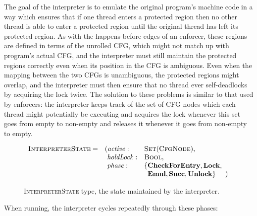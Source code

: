  The goal of the interpreter is to emulate the original
program's machine code in a way which ensures that if one thread
enters a protected region then no other thread is able to enter a
protected region until the original thread has left its protected
region.  As with the happens-before edges of an
enforcer, these regions are defined in terms of the
unrolled CFG, which might not match up with program's actual CFG, and
the interpreter must still maintain the protected regions correctly
even when its position in the CFG is ambiguous.  Even when the mapping
between the two CFGs is unambiguous, the protected regions might
overlap, and the interpreter must then ensure that no thread ever
self-deadlocks by acquiring the lock twice.  The solution to these
problems is similar to that used by enforcers: the interpreter keeps
track of the set of CFG nodes which each thread might potentially be
executing and acquires the lock whenever this set goes from empty to
non-empty and releases it whenever it goes from non-empty to empty.

\begin{figure}
  \begin{displaymath}
    \begin{array}{llll}
      \textsc{InterpreterState} = & (\mathit{active}: &\textsc{Set}(\textsc{CfgNode}), &\\
      & \,\,\mathit{holdLock}: &\textsc{Bool},\\
      & \,\,\mathit{phase}: & \{\mathbf{CheckForEntry}, \mathbf{Lock}, \\
      &                     & \,\,\,\mathbf{Emul}, \mathbf{Succ}, \mathbf{Unlock}\} &\!\!\!)\\
    \end{array}
  \end{displaymath}
  \caption{\textsc{InterpreterState} type, the state maintained by the
    interpreter.}
  \label{fig:fix_bugs:interpreter_state}
\end{figure}

When running, the interpreter cycles repeatedly through these phases:

